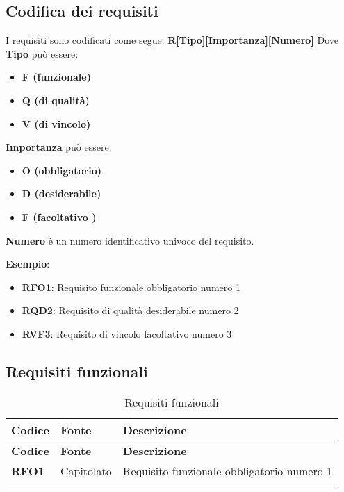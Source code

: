\subsection{Codifica dei requisiti}
I requisiti sono codificati come segue: \textbf{R[Tipo][Importanza][Numero]}
\newline
Dove \textbf{Tipo} può essere:
\begin{itemize}
    \item \textbf{F (funzionale)}
    \item \textbf{Q (di qualità)}
    \item \textbf{V (di vincolo)}
\end{itemize}
\textbf{Importanza} può essere:
\begin{itemize}
    \item \textbf{O (obbligatorio)}
    \item \textbf{D (desiderabile)}
    \item \textbf{F (facoltativo )}
\end{itemize}
\textbf{Numero} è un numero identificativo univoco del requisito.

\textbf{Esempio}:
\begin{itemize}
    \item \textbf{RFO1}: Requisito funzionale obbligatorio numero 1
    \item \textbf{RQD2}: Requisito di qualità desiderabile numero 2
    \item \textbf{RVF3}: Requisito di vincolo facoltativo numero 3
\end{itemize}

\pagebreak
\subsection{Requisiti funzionali}
\begin{longtable}{|>{\centering\arraybackslash}m{}|>{\centering\arraybackslash}m{}|>{\centering\arraybackslash}m{}|}
	\hline
	\textbf{Codice} & \textbf{Fonte} & \textbf{Descrizione}\\\hline
	\endfirsthead
	\hline
	\textbf{Codice} & \textbf{Fonte} & \textbf{Descrizione}\\\hline
	\endhead
	\hline
	\textbf{RFO1}            & Capitolato    & Requisito funzionale obbligatorio numero 1
	\\\hline
	\caption{Requisiti funzionali}
\end{longtable}

\pagebreak
